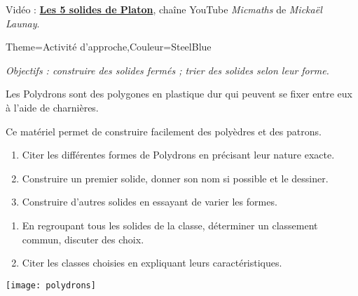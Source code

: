 \hfill {\gray Vidéo : \href{ttps://www.yout-ube.com/watch?v=eDsFmYur9Yo}{\bf Les 5 solides de Platon}, chaîne YouTube {\it Micmaths} de {\it Mickaël Launay}.}


\begin{Maquette}[Cours]{Theme={Activité d'approche},Couleur={SteelBlue}}


      {\it Objectifs : construire des solides fermés ; trier des solides selon leur forme.}

      \begin{AActivite}

         Les Polydrons sont des polygones en plastique dur qui peuvent se fixer entre eux à l'aide de charnières. \par
         Ce matériel permet de construire facilement des polyèdres et des patrons. \par
         
            \begin{enumerate}
               \item Citer les différentes formes de Polydrons en précisant leur nature exacte. \par \medskip
                  \pointilles
               \item Construire un premier solide, donner son nom si possible et le dessiner. \par \vskip35mm      
               \item Construire d'autres solides en essayant de varier les formes.
            \end{enumerate} 

            \begin{enumerate}
               \item En regroupant tous les solides de la classe, déterminer un classement commun, discuter des choix.
               \item Citer les classes choisies en expliquant leurs caractéristiques. \par \medskip
                  \pointilles\par \medskip
                  \pointilles \par \medskip
                  \pointilles \par \medskip
                  \pointilles \par \medskip
                  \pointilles \par \medskip
            \end{enumerate}
            \begin{center}
               \texttt{[image: polydrons]}
            \end{center}

   \end{AActivite}

\end{Maquette}


